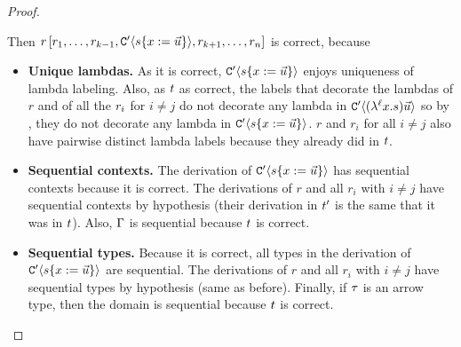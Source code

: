 \begin{proof}
\begin{enumerate}
Then $r\,[r_1,\hdots, r_{k-1},\mathtt{C}'\langle s\{x := \vec{u}\}\rangle, r_{k+1},
\hdots,r_n]$ is correct, because
\begin{itemize}
\item {\bf Unique lambdas.}
      As it is correct, $\mathtt{C}'\langle s\{x := \vec{u}\}\rangle$ enjoys uniqueness of lambda labeling.
      Also, as $t$ as correct, the labels that decorate the lambdas of $r$
        and of all the $r_i$ for $i\neq j$ do not decorate any lambda in 
        $\mathtt{C}'\langle(\lambda^{\ell} x. s) \vec{u}\rangle$
      so by , they do not decorate any lambda in
        $\mathtt{C}'\langle s\{x := \vec{u}\}\rangle$. $r$ and $r_i$ for all $i \neq j$ also have
        pairwise distinct lambda labels because they already did in $t$.
\item {\bf Sequential contexts.}
      The derivation of $\mathtt{C}'\langle s\{x := \vec{u}\}\rangle$ has sequential contexts because
      it is correct.
      The derivations of $r$ and all $r_i$ with $i \neq j$ have sequential contexts by hypothesis
      (their derivation in $t'$ is the same that it was in $t$).
      Also, $\Gamma$ is sequential because $t$ is correct.
\item {\bf Sequential types.} Because it is correct, all types in the derivation of
          $\mathtt{C}'\langle s\{x := \vec{u}\}\rangle$
      are sequential.
      The derivations of $r$ and all $r_i$ with $i \neq j$ have sequential types by hypothesis (same as before).
      Finally, if $\tau$ is an arrow type, then the domain is sequential because $t$ is correct.
\end{itemize}
\end{enumerate}
\end{proof}
